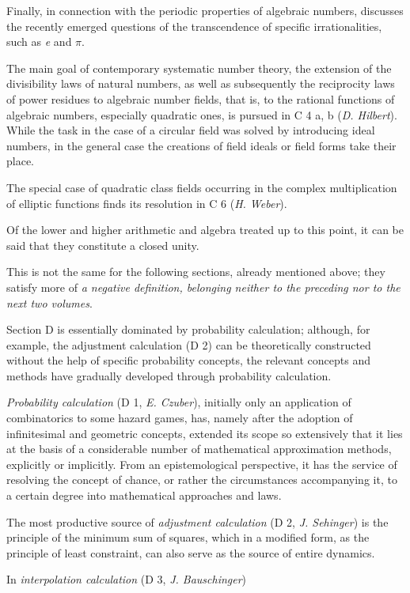 \thispagestyle{fancy}

\vspace{0.5cm}

Finally, in connection with the periodic properties of algebraic numbers, discusses the recently emerged questions of the transcendence of specific irrationalities, such as \textit{e} and $\pi$.

The main goal of contemporary systematic number theory, the extension of the divisibility laws of natural numbers, as well as subsequently the reciprocity laws of power residues to algebraic number fields, that is, to the rational functions of algebraic numbers, especially quadratic ones, is pursued in C 4 a, b (\textit{D. Hilbert}). While the task in the case of a circular field was solved by introducing ideal numbers, in the general case the creations of field ideals or field forms take their place.

The special case of quadratic class fields occurring in the complex multiplication of elliptic functions finds its resolution in C 6 (\textit{H. Weber}).

Of the lower and higher arithmetic and algebra treated up to this point, it can be said that they constitute a closed unity.

This is not the same for the following sections, already mentioned above; they satisfy more of \textit{a negative definition, belonging neither to the preceding nor to the next two volumes}.

Section D is essentially dominated by probability calculation; although, for example, the adjustment calculation (D 2) can be theoretically constructed without the help of specific probability concepts, the relevant concepts and methods have gradually developed through probability calculation.

\textit{Probability calculation} (D 1, \textit{E. Czuber}), initially only an application of combinatorics to some hazard games, has, namely after the adoption of infinitesimal and geometric concepts, extended its scope so extensively that it lies at the basis of a considerable number of mathematical approximation methods, explicitly or implicitly. From an epistemological perspective, it has the service of resolving the concept of chance, or rather the circumstances accompanying it, to a certain degree into mathematical approaches and laws.

The most productive source of \textit{adjustment calculation} (D 2, \textit{J. Sehinger}) is the principle of the minimum sum of squares, which in a modified form, as the principle of least constraint, can also serve as the source of entire dynamics.

In \textit{interpolation calculation} (D 3, \textit{J. Bauschinger})
